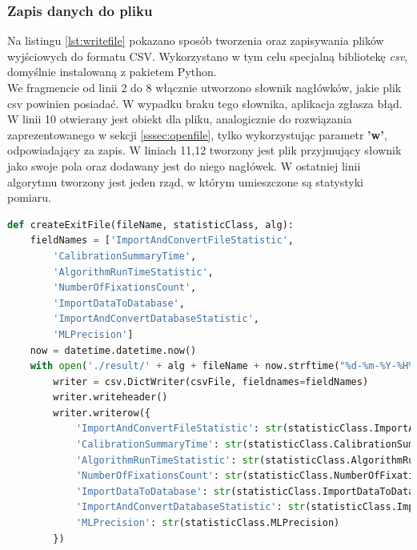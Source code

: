 \subsubsection{Zapis danych do pliku}
\label{sssec:savefile}
Na listingu \ref{lst:writefile} pokazano sposób tworzenia oraz zapisywania plików wyjściowych do formatu CSV. Wykorzystano w tym celu specjalną bibliotekę \emph{csv}, domyślnie instalowaną z pakietem Python.\\
We fragmencie od linii 2 do 8 włącznie utworzono słownik nagłówków, jakie plik csv powinien posiadać. W wypadku braku tego słownika, aplikacja zgłasza błąd. W linii 10 otwierany jest obiekt dla pliku, analogicznie do rozwiązania zaprezentowanego w sekcji \ref{sssec:openfile}, tylko wykorzystując parametr \textbf{'w'}, odpowiadający za zapis. W liniach 11,12 tworzony jest plik przyjmujący słownik jako swoje pola oraz dodawany jest do niego nagłówek. W ostatniej linii algorytmu tworzony jest jeden rząd, w którym umieszczone są statystyki pomiaru.
\begin{lstlisting}[language=Python, caption=Zapis danych do pliku csv, label={lst:writefile}]
def createExitFile(fileName, statisticClass, alg):
    fieldNames = ['ImportAndConvertFileStatistic',
        'CalibrationSummaryTime',
        'AlgorithmRunTimeStatistic',
        'NumberOfFixationsCount',
        'ImportDataToDatabase',
        'ImportAndConvertDatabaseStatistic',
        'MLPrecision']
    now = datetime.datetime.now()
    with open('./result/' + alg + fileName + now.strftime("%d-%m-%Y-%H%M%S") + '.csv', 'w', newline='') as csvFile:
        writer = csv.DictWriter(csvFile, fieldnames=fieldNames)
        writer.writeheader()
        writer.writerow({
            'ImportAndConvertFileStatistic': str(statisticClass.ImportAndConvertFileStatistic),
            'CalibrationSummaryTime': str(statisticClass.CalibrationSummaryTime),
            'AlgorithmRunTimeStatistic': str(statisticClass.AlgorithmRunTimeStatistic),
            'NumberOfFixationsCount': str(statisticClass.NumberOfFixationsCount),
            'ImportDataToDatabase': str(statisticClass.ImportDataToDatabase),
            'ImportAndConvertDatabaseStatistic': str(statisticClass.ImportAndConvertDatabaseStatistic),
            'MLPrecision': str(statisticClass.MLPrecision)
        })
\end{lstlisting}
